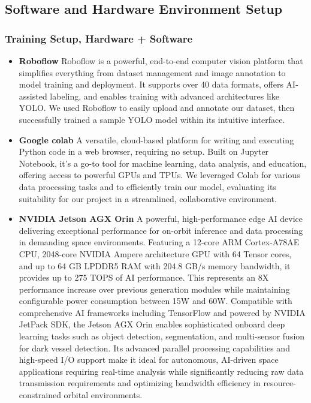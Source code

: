 \documentclass{article}
\begin{document}
	\subsection{Software and Hardware Environment Setup}
	\subsubsection{Training Setup, Hardware + Software}
	\begin{itemize}
		\item \textbf{Roboflow}
		Roboflow is a powerful, end-to-end computer vision platform that simplifies everything from dataset management and image annotation to model training and deployment. It supports over 40 data formats, offers AI-assisted labeling, and enables training with advanced architectures like YOLO. We used Roboflow to easily upload and annotate our dataset, then successfully trained a sample YOLO model within its intuitive interface. \item \textbf{Google colab}
		A versatile, cloud-based platform for writing and executing Python code in a web browser, requiring no setup. Built on Jupyter Notebook, it's a go-to tool for machine learning, data analysis, and education, offering access to powerful GPUs and TPUs. We leveraged Colab for various data processing tasks and to efficiently train our model, evaluating its suitability for our project in a streamlined, collaborative environment.
		
		
		\item 	\textbf{NVIDIA Jetson AGX Orin} A powerful, high-performance edge AI device delivering exceptional performance for on-orbit inference and data processing in demanding space environments. Featuring a 12-core ARM Cortex-A78AE CPU, 2048-core NVIDIA Ampere architecture GPU with 64 Tensor cores, and up to 64 GB LPDDR5 RAM with 204.8 GB/s memory bandwidth, it provides up to 275 TOPS of AI performance. This represents an 8X performance increase over previous generation modules while maintaining configurable power consumption between 15W and 60W. Compatible with comprehensive AI frameworks including TensorFlow and powered by NVIDIA JetPack SDK, the Jetson AGX Orin enables sophisticated onboard deep learning tasks such as object detection, segmentation, and multi-sensor fusion for dark vessel detection. Its advanced parallel processing capabilities and high-speed I/O support make it ideal for autonomous, AI-driven space applications requiring real-time analysis while significantly reducing raw data transmission requirements and optimizing bandwidth efficiency in resource-constrained orbital environments.
		

\end{itemize}
\end{document}
